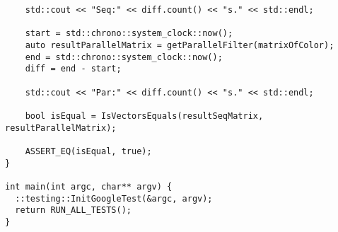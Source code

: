 \documentclass{report}
\begin{document}
\begin{lstlisting}
    std::cout << "Seq:" << diff.count() << "s." << std::endl;

    start = std::chrono::system_clock::now();
    auto resultParallelMatrix = getParallelFilter(matrixOfColor);
    end = std::chrono::system_clock::now();
    diff = end - start;

    std::cout << "Par:" << diff.count() << "s." << std::endl;

    bool isEqual = IsVectorsEquals(resultSeqMatrix, resultParallelMatrix);

    ASSERT_EQ(isEqual, true);
}

int main(int argc, char** argv) {
  ::testing::InitGoogleTest(&argc, argv);
  return RUN_ALL_TESTS();
}

\end{lstlisting}
\end{document}
